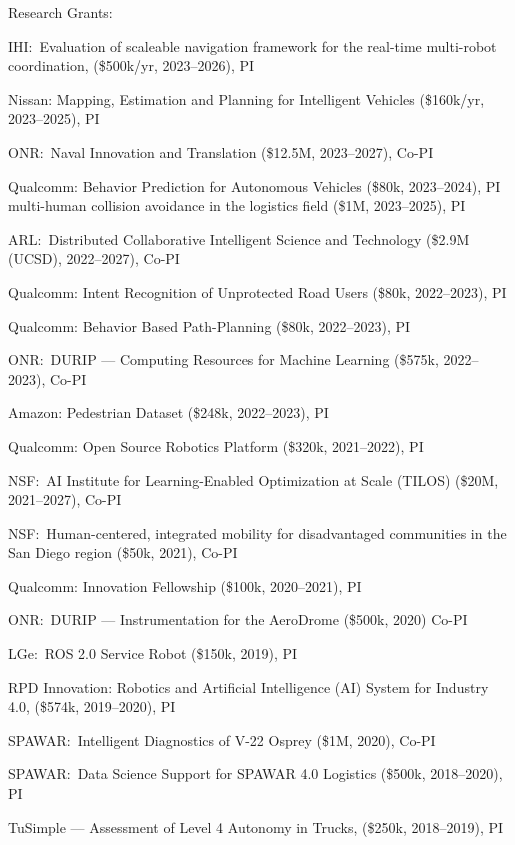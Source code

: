 \documentclass{article}
\begin{document}
\begin{cv}
\begin{cvlist}{Research Grants:}
  \item IHI:\ Evaluation of scaleable navigation framework for the real-time
  multi-robot coordination, (\$500k/yr, 2023--2026), PI
  \item Nissan: Mapping, Estimation and Planning for Intelligent Vehicles
  (\$160k/yr, 2023--2025), PI
  \item ONR:\ Naval Innovation and Translation (\$12.5M, 2023--2027), Co-PI
  \item Qualcomm: Behavior Prediction for Autonomous Vehicles (\$80k, 2023--2024), PI
  multi-human collision avoidance in the logistics field (\$1M, 2023--2025), PI
  \item ARL:\ Distributed Collaborative Intelligent Science and Technology (\$2.9M
  (UCSD), 2022--2027), Co-PI
  \item Qualcomm: Intent Recognition of Unprotected Road Users (\$80k, 2022--2023),
  PI
  \item Qualcomm: Behavior Based Path-Planning (\$80k, 2022--2023), PI
  \item ONR:\ DURIP --- Computing Resources for Machine Learning (\$575k, 2022--2023),
  Co-PI
  \item Amazon: Pedestrian Dataset (\$248k, 2022--2023), PI
\item Qualcomm: Open Source Robotics Platform (\$320k, 2021--2022), PI
\item NSF:\ AI Institute for Learning-Enabled Optimization at Scale
  (TILOS) (\$20M, 2021--2027), Co-PI
\item NSF:\ Human-centered, integrated mobility for disadvantaged
  communities in the San Diego region (\$50k, 2021), Co-PI
\item Qualcomm: Innovation Fellowship (\$100k, 2020--2021), PI
\item ONR:\ DURIP --- Instrumentation for the AeroDrome (\$500k, 2020) Co-PI
\item LGe:\ ROS 2.0 Service Robot (\$150k, 2019), PI
\item RPD Innovation: Robotics and Artificial Intelligence (AI) System for 
  Industry 4.0, (\$574k, 2019--2020), PI 
\item SPAWAR:\ Intelligent Diagnostics of V-22 Osprey (\$1M, 2020), Co-PI
\item SPAWAR:\ Data Science Support for SPAWAR 4.0 Logistics (\$500k,
  2018--2020), PI
\item TuSimple --- Assessment of Level 4 Autonomy in Trucks,  (\$250k,
  2018--2019), PI

\end{cvlist}
\end{cv}
\end{document}
